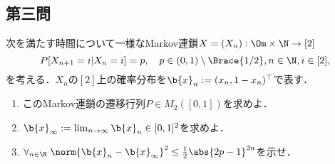 \documentclass[uplatex,dvipdfmx]{jsarticle}
\begin{document}
\subsection{第三問}

\begin{tcolorbox}[colframe=ForestGreen, colback=ForestGreen!10!white,breakable,colbacktitle=ForestGreen!40!white,coltitle=black,fonttitle=\bfseries\sffamily,
    title=第３問]
    \begin{problem}\label{prob-21-1-3-ProMtrx}
        次を満たす時間について一様なMarkov連鎖$X=(X_n):\Om\times\N\to[2]$
        \[P[X_{n+1}=i|X_{n}=i]=p,\quad p\in(0,1)\setminus\Brace{1/2},n\in\N,i\in[2],\]
        を考える．$X_n$の$[2]$上の確率分布を$\b{x}_n:=(x_n,1-x_n)^\top$で表す．
        \begin{enumerate}
            \item このMarkov連鎖の遷移行列$P\in M_2([0,1])$を求めよ．
            \item $\b{x}_\infty:=\lim_{n\to\infty}\b{x}_n\in[0,1]^2$を求めよ．
            \item $\forall_{n\in\N}\;\norm{\b{x}_n-\b{x}_\infty}^2\le\frac{1}{2}\abs{2p-1}^{2n}$を示せ．
        \end{enumerate}
    \end{problem}
\end{tcolorbox}
\end{document}
